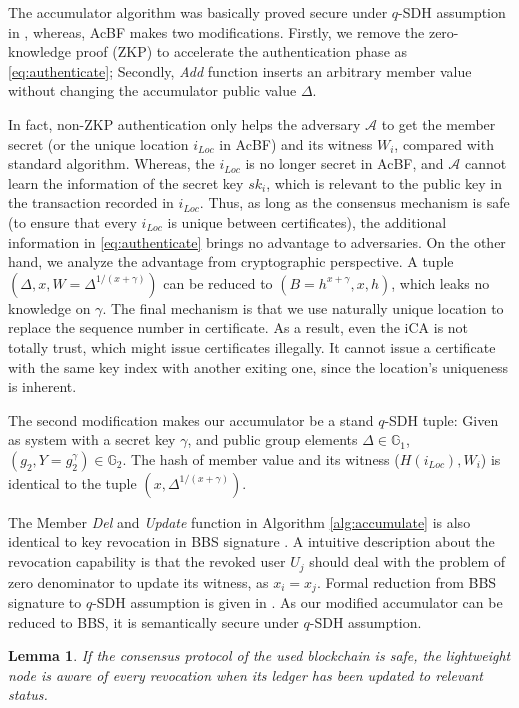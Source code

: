 \documentclass[conference]{IEEEtran}
\newtheorem{lemma}{Lemma}[theorem]
\begin{document}
\begin{IEEEproof}
	The accumulator algorithm was basically proved secure under $q$-SDH assumption in \cite{accumulator}, whereas, AcBF makes two modifications. Firstly, we remove the zero-knowledge proof (ZKP) to accelerate the authentication phase as \eqref{eq:authenticate}; Secondly, \textit{Add} function inserts an arbitrary member value without changing the accumulator public value $\Delta$. 
	
	In fact, non-ZKP authentication only helps the adversary $\mathcal{A}$ to get the member secret (or the unique location $i_{Loc}$ in AcBF) and its witness $W_i$, compared with standard algorithm. Whereas, the $i_{Loc}$ is no longer secret in AcBF, and $\mathcal{A}$ cannot learn the information of the secret key $sk_i$, which is relevant to the public key in the transaction recorded in $i_{Loc}$. Thus, as long as the consensus mechanism is safe (to ensure that every $i_{Loc}$ is unique between certificates), the additional information in \eqref{eq:authenticate} brings no advantage to adversaries. On the other hand, we analyze the advantage from cryptographic perspective. A tuple $(\Delta, x, W = \Delta^{1/(x + \gamma)})$ can be reduced to $(B=h^{x+\gamma}, x, h)$, which leaks no knowledge on $\gamma$. The final mechanism is that we use naturally unique location to replace the sequence number in certificate. As a result, even the iCA is not totally trust, which might issue certificates illegally. It cannot issue a certificate with the same key index with another exiting one, since the location's uniqueness is inherent.
	
	The second modification makes our accumulator be a stand $q$-SDH tuple: Given as system with a secret key $\gamma$, and public group elements $\Delta \in \mathbb{G}_1$, $(g_2, Y = g_2^\gamma)\in \mathbb{G}_2$. The hash of member value and its witness ($H(i_{Loc}), W_i$) is identical to the tuple $(x, \Delta^{1/(x+\gamma)})$. 

	The Member \textit{Del} and \textit{Update} function in Algorithm \ref{alg:accumulate} is also identical to key revocation in BBS signature \cite{Boneh2004}. A intuitive description about the revocation capability is that the revoked user $U_j$ should deal with the problem of zero denominator to update its witness, as $x_i=x_j$. Formal reduction from BBS signature to $q$-SDH assumption is given in \cite{Boneh2004}. As our modified accumulator can be reduced to BBS, it is semantically secure under $q$-SDH assumption. 
\end{IEEEproof}
\begin{lemma}
    If the consensus protocol of the used blockchain is safe, the lightweight node is aware of every revocation when its ledger has been updated to relevant status.
\end{lemma}
\end{document}
